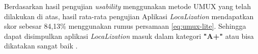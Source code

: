 
\par Berdasarkan hasil pengujian \textit{usability} menggunakan metode UMUX yang telah dilakukan di atas, hasil rata-rata pengujian Aplikasi \textit{LocaLization} mendapatkan skor sebesar 84,13\% menggunakan rumus persamaan \ref{eq:umux-lite}. Sehingga dapat disimpulkan aplikasi \textit{LocaLization} masuk dalam kategori \textbf{"A+"} atau bisa dikatakan sangat baik \citep{Lewis2018}.